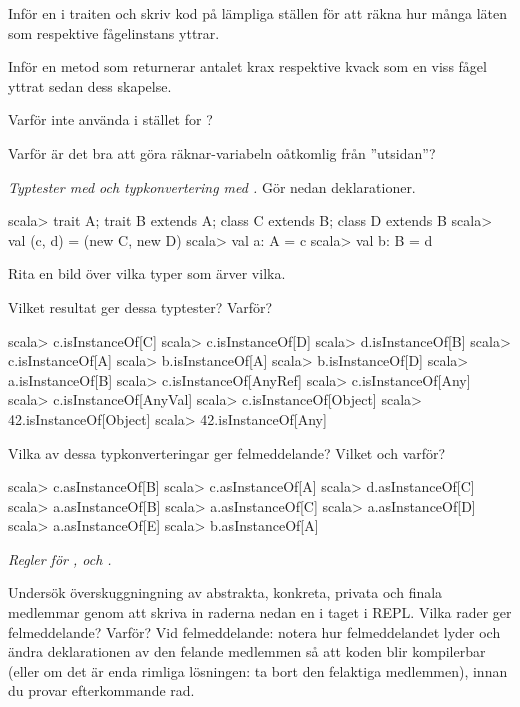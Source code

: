 \Subtask Inför en  i traiten  och skriv kod på lämpliga ställen för att räkna hur många läten som respektive fågelinstans yttrar.

\Subtask Inför en metod  som returnerar antalet krax respektive kvack som en viss fågel yttrat sedan dess skapelse.

\Subtask\Pen Varför inte använda  i stället for ?

\Subtask\Pen Varför är det bra att göra räknar-variabeln oåtkomlig från ''utsidan''? 



\Task \emph{Typtester med  och typkonvertering med .} Gör nedan deklarationer.
\begin{REPL}
scala> trait A; trait B extends A; class C extends B; class D extends B
scala> val (c, d) = (new C, new D)   
scala> val a: A = c
scala> val b: B = d
\end{REPL}

\Subtask Rita en bild över vilka typer som ärver vilka.

\Subtask Vilket resultat ger dessa typtester? Varför?
\begin{REPL}
scala> c.isInstanceOf[C]
scala> c.isInstanceOf[D]
scala> d.isInstanceOf[B]
scala> c.isInstanceOf[A]
scala> b.isInstanceOf[A]
scala> b.isInstanceOf[D]
scala> a.isInstanceOf[B]
scala> c.isInstanceOf[AnyRef]
scala> c.isInstanceOf[Any]
scala> c.isInstanceOf[AnyVal]
scala> c.isInstanceOf[Object]
scala> 42.isInstanceOf[Object]
scala> 42.isInstanceOf[Any]
\end{REPL}

\Subtask Vilka av dessa typkonverteringar ger felmeddelande? Vilket och varför?
\begin{REPL}
scala> c.asInstanceOf[B]
scala> c.asInstanceOf[A]
scala> d.asInstanceOf[C]
scala> a.asInstanceOf[B]
scala> a.asInstanceOf[C]
scala> a.asInstanceOf[D]
scala> a.asInstanceOf[E]
scala> b.asInstanceOf[A]
\end{REPL}



\Task \emph{Regler för ,  och .} 

\Subtask \label{subtask:overriderules} Undersök överskuggningning av abstrakta, konkreta, privata och finala medlemmar genom att skriva in raderna nedan en i taget i REPL. Vilka rader ger felmeddelande? Varför? Vid felmeddelande: notera hur felmeddelandet lyder och ändra deklarationen av den felande medlemmen så att koden blir kompilerbar (eller om det är enda rimliga lösningen: ta bort den felaktiga medlemmen), innan du provar efterkommande rad. 

